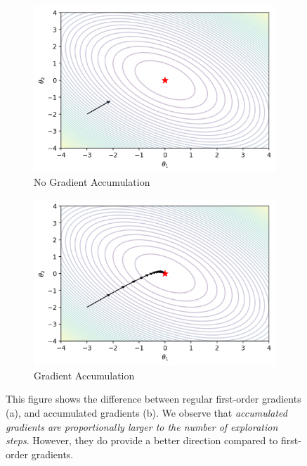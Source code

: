 \begin{figure}[H]
  \centering
  \begin{subfigure}{.49\textwidth}
    \includegraphics[width=\linewidth]{resources/images/agn_no_accumulated}
    \caption{No Gradient Accumulation}
  \end{subfigure}
    \begin{subfigure}{.49\textwidth}
    \includegraphics[width=\linewidth]{resources/images/agn_accumulated}
    \caption{Gradient Accumulation}
  \end{subfigure}
  \caption{This figure shows the difference between regular first-order gradients (a), and accumulated gradients (b). We observe that \emph{accumulated gradients are proportionally larger to the number of exploration steps}. However, they do provide a better direction compared to first-order gradients.}
  \label{fig:downpour_accumulation_issue}
\end{figure}

